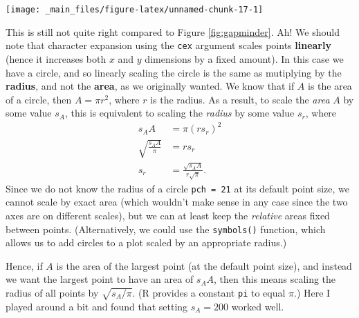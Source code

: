 \documentclass[]{book}
\newenvironment{Shaded}{\begin{snugshade}}{\end{snugshade}}
\newcommand{\KeywordTok}[1]{\textcolor[rgb]{0.13,0.29,0.53}{\textbf{{#1}}}}
\newcommand{\DataTypeTok}[1]{\textcolor[rgb]{0.13,0.29,0.53}{{#1}}}
\newcommand{\DecValTok}[1]{\textcolor[rgb]{0.00,0.00,0.81}{{#1}}}
\newcommand{\StringTok}[1]{\textcolor[rgb]{0.31,0.60,0.02}{{#1}}}
\newcommand{\NormalTok}[1]{{#1}}
\theoremstyle{definition}
\theoremstyle{definition}
\theoremstyle{definition}
\theoremstyle{remark}
\begin{document}
\begin{center}\texttt{[image: \_main\_files/figure-latex/unnamed-chunk-17-1]} \end{center}

This is still not quite right compared to Figure \ref{fig:gapminder}.
Ah! We should note that character expansion using the \texttt{cex}
argument scales points \textbf{linearly} (hence it increases both \(x\)
and \(y\) dimensions by a fixed amount). In this case we have a circle,
and so linearly scaling the circle is the same as mutiplying by the
\textbf{radius}, and not the \textbf{area}, as we originally wanted. We
know that if \(A\) is the area of a circle, then \(A = \pi r^2\), where
\(r\) is the radius. As a result, to scale the \emph{area} \(A\) by some
value \(s_A\), this is equivalent to scaling the \emph{radius} by some
value \(s_r\), where \[
    \begin{aligned}
    s_A A &= \pi \left(rs_r\right)^2\\
    \sqrt{\frac{s_A A}{\pi}} &= rs_r\\
    s_r &= \frac{\sqrt{s_A A}}{r\sqrt{\pi}}.
    \end{aligned}
\] Since we do not know the radius of a circle \texttt{pch\ =\ 21} at
its default point size, we cannot scale by exact area (which wouldn't
make sense in any case since the two axes are on different scales), but
we can at least keep the \emph{relative} areas fixed between points.
(Alternatively, we could use the \texttt{symbols()} function, which
allows us to add circles to a plot scaled by an appropriate radius.)

Hence, if \(A\) is the area of the largest point (at the default point
size), and instead we want the largest point to have an area of
\(s_A A\), then this means scaling the radius of all points by
\(\sqrt{s_A / \pi}\). (R provides a constant \texttt{pi} to equal
\(\pi\).) Here I played around a bit and found that setting
\(s_A = 200\) worked well.

\begin{Shaded}
\end{Shaded}
\end{document}
